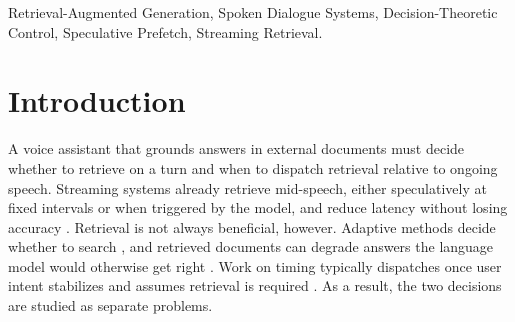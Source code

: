 \begin{abstract}
A streaming voice dialogue system must decide whether to retrieve external
knowledge and when to dispatch the query while the user is still speaking. We
ask whether optimizing these two decisions jointly outperforms a decomposed
controller that faces the same latency and compute prices. Under
timing-invariant quality, constant latency overlap and a dispatch-invariant
belief (A1--A3), we prove that the joint controller makes the same retrieval
decisions as a decomposed controller at a mapped price, and that a decomposed
controller pricing the expected exposed latency is identical to it. Without
these assumptions, coupling can help mainly when the belief sharpens during
the turn and a dispatched retrieval is committed. We then ran a
pre-registered test on open-domain and customer-support speech with live
automatic speech recognition (ASR) partials. On 3,734 open-domain test
questions the joint controller was worse than the strongest decomposed rival
under commitment (utility difference $-0.037$, 95\% CI $[-0.048,-0.025]$):
the boundary hypotheses were not supported and the pre-registered reverse
hypothesis held. Customer-support and pooled results point the same way but
are exploratory. The gap disappears on clean text, which points to
recognition errors in early partial transcripts and a weak belief signal.
\end{abstract}
\begin{IEEEkeywords}
Retrieval-Augmented Generation, Spoken Dialogue Systems, Decision-Theoretic Control, Speculative Prefetch, Streaming Retrieval.
\end{IEEEkeywords}


\section{Introduction}\label{sec:intro}

A voice assistant that grounds answers in external documents must decide whether to retrieve on a turn and when to dispatch retrieval relative to ongoing speech. Streaming systems already retrieve mid-speech, either speculatively at fixed intervals or when triggered by the model, and reduce latency without losing accuracy \cite{arora2026streamrag,jung2026hiding}. Retrieval is not always beneficial, however. Adaptive methods decide whether to search \cite{jiang2023flare,su2024dragin,jeong2024adaptiverag}, and retrieved documents can degrade answers the language model would otherwise get right \cite{mallen2023trust}. Work on timing typically dispatches once user intent stabilizes and assumes retrieval is required \cite{galbraith2026streaming}. As a result, the two decisions are studied as separate problems.

